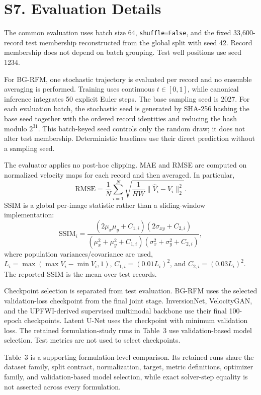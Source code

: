 \documentclass[11pt]{article}
\begin{document}
\section{S7. Evaluation Details}

The common evaluation uses batch size 64, \texttt{shuffle=False}, and the fixed 33,600-record test membership reconstructed from the global split with seed 42. Record membership does not depend on batch grouping. Test well positions use seed 1234.

For BG-RFM, one stochastic trajectory is evaluated per record and no ensemble averaging is performed. Training uses continuous $t\in[0,1]$, while canonical inference integrates 50 explicit Euler steps. The base sampling seed is 2027. For each evaluation batch, the stochastic seed is generated by SHA-256 hashing the base seed together with the ordered record identities and reducing the hash modulo $2^{31}$. This batch-keyed seed controls only the random draw; it does not alter test membership. Deterministic baselines use their direct prediction without a sampling seed.

The evaluator applies no post-hoc clipping. MAE and RMSE are computed on normalized velocity maps for each record and then averaged. In particular,
\begin{equation}
\mathrm{RMSE}
=
\frac{1}{N}\sum_{i=1}^N
\sqrt{\frac{1}{HW}\|\hat V_i-V_i\|_2^2}.
\end{equation}
SSIM is a global per-image statistic rather than a sliding-window implementation:
\begin{equation}
\mathrm{SSIM}_i=
\frac{(2\mu_x\mu_y+C_{1,i})(2\sigma_{xy}+C_{2,i})}
{(\mu_x^2+\mu_y^2+C_{1,i})(\sigma_x^2+\sigma_y^2+C_{2,i})},
\end{equation}
where population variances/covariance are used,
$L_i=\max(\max V_i-\min V_i,1)$,
$C_{1,i}=(0.01L_i)^2$, and $C_{2,i}=(0.03L_i)^2$.
The reported SSIM is the mean over test records.

Checkpoint selection is separated from test evaluation. BG-RFM uses the selected validation-loss checkpoint from the final joint stage. InversionNet, VelocityGAN, and the UPFWI-derived supervised multimodal backbone use their final 100-epoch checkpoints. Latent U-Net uses the checkpoint with minimum validation loss. The retained formulation-study runs in Table~3 use validation-based model selection. Test metrics are not used to select checkpoints.

Table~3 is a supporting formulation-level comparison. Its retained runs share the dataset family, split contract, normalization, target, metric definitions, optimizer family, and validation-based model selection, while exact solver-step equality is not asserted across every formulation.
\end{document}
